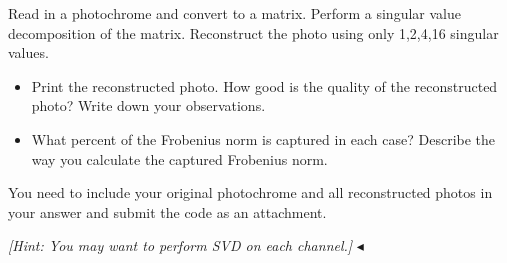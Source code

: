 \documentclass[11pt]{article}
\newenvironment{problem}[2][Problem]{\begin{trivlist}
\item[\hskip \labelsep {\bfseries #1}\hskip \labelsep {\bfseries #2.}]}{\hfill$\blacktriangleleft$\end{trivlist}}
\begin{document}
\begin{problem}{7 (10')}
Read in a photochrome and convert to a matrix. Perform a singular value decomposition of the matrix. Reconstruct the photo using only 1,2,4,16 singular values.
\begin{itemize}
    \item [(1)] Print the reconstructed photo. How good is the quality of the reconstructed photo? Write down your observations.
    \item [(2)] What percent of the Frobenius norm is captured in each case? Describe the way you calculate the captured Frobenius norm.
\end{itemize}

You need to include your original photochrome and all reconstructed photos in your answer and submit the code as an attachment.

\textit{[Hint: You may want to perform SVD on each channel.]}
\end{problem}
\newpage
\end{document}
